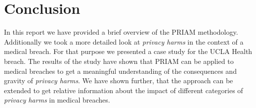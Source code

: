 \section{Conclusion}
In this report we have provided a brief overview of the PRIAM methodology. Additionally we took a more detailed look at \textit{privacy harms} in the context of a medical breach. For that purpose we presented a case study for the UCLA Health breach. The results of the study have shown that PRIAM can be applied to medical breaches to get a meaningful understanding of the consequences and gravity of \textit{privacy harms}. We have shown further, that the approach can be extended to get relative information about the impact of different categories of \textit{privacy harms} in medical breaches.


